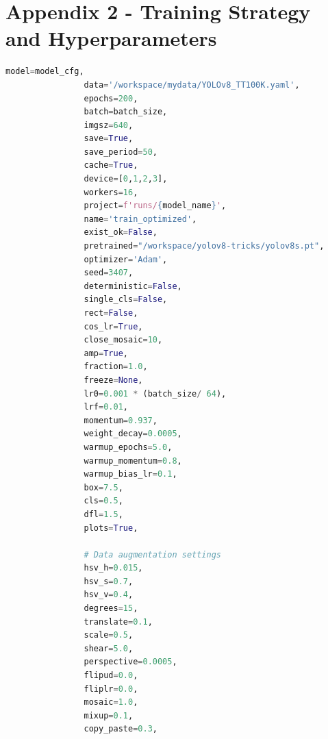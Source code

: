 \documentclass[10pt]{article}
\begin{document}
\section{Appendix 2 - Training Strategy and Hyperparameters}
\begin{lstlisting}[language=Python]
                model=model_cfg,
                data='/workspace/mydata/YOLOv8_TT100K.yaml',
                epochs=200,
                batch=batch_size,
                imgsz=640,
                save=True,
                save_period=50,
                cache=True,
                device=[0,1,2,3],
                workers=16,
                project=f'runs/{model_name}',
                name='train_optimized',
                exist_ok=False,
                pretrained="/workspace/yolov8-tricks/yolov8s.pt",
                optimizer='Adam',
                seed=3407,
                deterministic=False,
                single_cls=False,
                rect=False,
                cos_lr=True,
                close_mosaic=10,
                amp=True,
                fraction=1.0,
                freeze=None,
                lr0=0.001 * (batch_size/ 64),
                lrf=0.01,
                momentum=0.937,
                weight_decay=0.0005,
                warmup_epochs=5.0,
                warmup_momentum=0.8,
                warmup_bias_lr=0.1,
                box=7.5,
                cls=0.5,
                dfl=1.5,
                plots=True,
                
                # Data augmentation settings
                hsv_h=0.015,
                hsv_s=0.7,
                hsv_v=0.4,
                degrees=15,
                translate=0.1,
                scale=0.5,
                shear=5.0,
                perspective=0.0005,
                flipud=0.0,
                fliplr=0.0,
                mosaic=1.0,
                mixup=0.1,
                copy_paste=0.3,
\end{lstlisting}
\newpage
\end{document}
